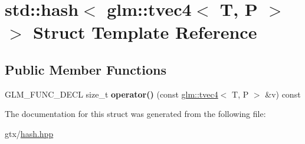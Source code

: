 \hypertarget{structstd_1_1hash_3_01glm_1_1tvec4_3_01T_00_01P_01_4_01_4}{\section{std\-:\-:hash$<$ glm\-:\-:tvec4$<$ T, P $>$ $>$ Struct Template Reference}
\label{structstd_1_1hash_3_01glm_1_1tvec4_3_01T_00_01P_01_4_01_4}
}
\subsection*{Public Member Functions}
\begin{DoxyCompactItemize}
\item 
\hypertarget{structstd_1_1hash_3_01glm_1_1tvec4_3_01T_00_01P_01_4_01_4_a4b421b6667e719ecc7014282429eeb72}{G\-L\-M\-\_\-\-F\-U\-N\-C\-\_\-\-D\-E\-C\-L size\-\_\-t {\bfseries operator()} (const \hyperlink{structglm_1_1tvec4}{glm\-::tvec4}$<$ T, P $>$ \&v) const }\label{structstd_1_1hash_3_01glm_1_1tvec4_3_01T_00_01P_01_4_01_4_a4b421b6667e719ecc7014282429eeb72}

\end{DoxyCompactItemize}


The documentation for this struct was generated from the following file\-:\begin{DoxyCompactItemize}
\item 
gtx/\hyperlink{hash_8hpp}{hash.\-hpp}\end{DoxyCompactItemize}
